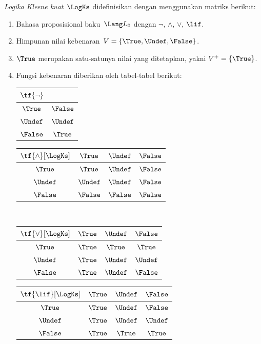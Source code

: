 \documentclass[../../../include/open-logic-section]{subfiles}
\begin{document}
\begin{defn}
\emph{Logika Kleene kuat}~$\LogKs$ didefinisikan dengan menggunakan matriks
berikut:
\begin{enumerate}
  \item Bahasa proposisional baku~$\Lang L_0$ dengan $\lnot$, $\land$,
  $\lor$, $\lif$.
  \item Himpunan nilai kebenaran~$V=\{\True,\Undef,\False\}$.
  \item $\True$ merupakan satu-satunya nilai yang ditetapkan, yakni
  $V^+=\{\True\}$.
  \item Fungsi kebenaran diberikan oleh tabel-tabel berikut:
  \begin{center}
    \begin{tabular}{c|c}
      $\tf{\lnot}$ & \\
      \hline
      $\True$ & $\False$ \\
      $\Undef$ & $\Undef$ \\
      $\False$ & $\True$
    \end{tabular}
    \quad
    \begin{tabular}{c|ccc}
      $\tf{\land}[\LogKs]$ & $\True$ & $\Undef$ & $\False$ \\
      \hline
      $\True$ & $\True$ & $\Undef$ & $\False$ \\
      $\Undef$ & $\Undef$ & $\Undef$ & $\False$\\
      $\False$ & $\False$ & $\False$ & $\False$
    \end{tabular}
    \\[2ex]
    \begin{tabular}{c|ccc}
      $\tf{\lor}[\LogKs]$ & $\True$ & $\Undef$ & $\False$ \\
      \hline
      $\True$ & $\True$ & $\True$ & $\True$ \\
      $\Undef$ & $\True$ & $\Undef$ & $\Undef$ \\
      $\False$ & $\True$ & $\Undef$ & $\False$
    \end{tabular}
    \quad
    \begin{tabular}{c|ccc}
      $\tf{\lif}[\LogKs]$ & $\True$ & $\Undef$ & $\False$ \\
      \hline
      $\True$ & $\True$ & $\Undef$ & $\False$ \\
      $\Undef$ & $\True$ & $\Undef$ & $\Undef$  \\
      $\False$ & $\True$ & $\True$ & $\True$
    \end{tabular}
  \end{center}
\end{enumerate}
\end{defn}
\end{document}
